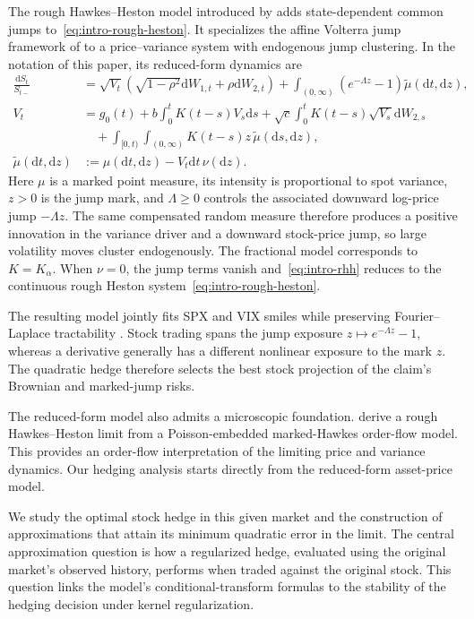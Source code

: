 \documentclass[11pt]{article}
\theoremstyle{definition}
\theoremstyle{remark}
\newcommand{\1}{\mathbf{1}}
\newcommand{\mut}{\widetilde\mu}
\newcommand{\dd}{\mathrm{d}}
\begin{document}
The rough Hawkes--Heston model introduced by \citet{bondi2024} adds
state-dependent common jumps to~\eqref{eq:intro-rough-heston}. It specializes
the affine Volterra jump framework of \citet{bondi2024affine} to a
price--variance system with endogenous jump clustering. In the notation of
this paper, its reduced-form dynamics are
\begin{equation}
\label{eq:intro-rhh}
\begin{aligned}
 \frac{\dd S_t}{S_{t-}}
 &=\sqrt{V_t}\left(\sqrt{1-\rho^2}\dd W_{1,t}
                   +\rho\dd W_{2,t}\right)
   +\int_{(0,\infty)}\left(e^{-\Lambda z}-1\right)
        \mut(\dd t,\dd z),\\
 V_t
 &=g_0(t)+b\int_0^tK(t-s)V_s\dd s
   +\sqrt c\int_0^tK(t-s)\sqrt{V_s}\dd W_{2,s}\\
 &\quad+\int_{[0,t)}\int_{(0,\infty)}K(t-s)z\,
        \mut(\dd s,\dd z),\\
 \mut(\dd t,\dd z)
 &:=\mu(\dd t,\dd z)-V_t\dd t\,\nu(\dd z).
\end{aligned}
\end{equation}
Here $\mu$ is a marked point measure, its intensity is proportional to spot
variance, $z>0$ is the jump mark, and $\Lambda\geq0$ controls the associated
downward log-price jump $-\Lambda z$. The same compensated random measure
therefore produces a positive innovation in the variance driver and a
downward stock-price jump, so large volatility moves cluster endogenously.
The fractional model corresponds to $K=K_\alpha$. When $\nu=0$, the jump
terms vanish and~\eqref{eq:intro-rhh} reduces to the continuous rough Heston
system~\eqref{eq:intro-rough-heston}.

The resulting model jointly fits SPX and VIX smiles while preserving
Fourier--Laplace tractability \citep{bondi2024}. Stock trading spans the jump exposure
$z\mapsto e^{-\Lambda z}-1$, whereas a derivative generally has a different
nonlinear exposure to the mark $z$. The quadratic hedge therefore selects the
best stock projection of the claim's Brownian and marked-jump risks.

The reduced-form model also admits a microscopic foundation.
\citet{wangwuzhu2026} derive a rough Hawkes--Heston limit from a
Poisson-embedded marked-Hawkes order-flow model. This provides an order-flow
interpretation of the limiting price and variance dynamics. Our hedging
analysis starts directly from the reduced-form asset-price model.

We study the optimal stock hedge in this given market and the construction
of approximations that attain its minimum quadratic error in the limit.
The central approximation question is how a regularized hedge, evaluated
using the original market's observed history, performs when traded against
the original stock. This question links the model's conditional-transform
formulas to the stability of the hedging decision under kernel
regularization.
\end{document}
